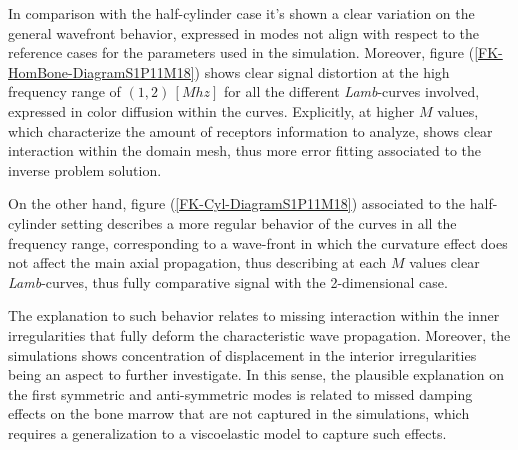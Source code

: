 In comparison with the half-cylinder case it's shown a clear variation on the general wavefront behavior, expressed in modes not align with respect to the reference cases for the parameters used in the simulation. Moreover, figure (\ref{FK-HomBone-DiagramS1P11M18}) shows clear signal distortion at the high frequency range of $(1, 2)\, [Mhz]$ for all the different \textit{Lamb}-curves involved, expressed in color diffusion within the curves. Explicitly, at higher $M$ values, which characterize the amount of receptors information to analyze, shows clear interaction within the domain mesh, thus more error fitting associated to the inverse problem solution.

On the other hand, figure (\ref{FK-Cyl-DiagramS1P11M18}) associated to the half-cylinder setting describes a more regular behavior of the curves in all the frequency range, corresponding to a wave-front in which the curvature effect does not affect the main axial propagation, thus describing at each $M$ values clear \textit{Lamb}-curves, thus fully comparative signal with the 2-dimensional case. 

The explanation to such behavior relates to missing interaction within the inner irregularities that fully deform the characteristic wave propagation. Moreover, the simulations shows concentration of displacement in the interior irregularities being an aspect to further investigate. In this sense, the plausible explanation on the first symmetric and anti-symmetric modes is related to missed damping effects on the bone marrow that are not captured in the simulations, which requires a generalization to a viscoelastic model to capture such effects.


